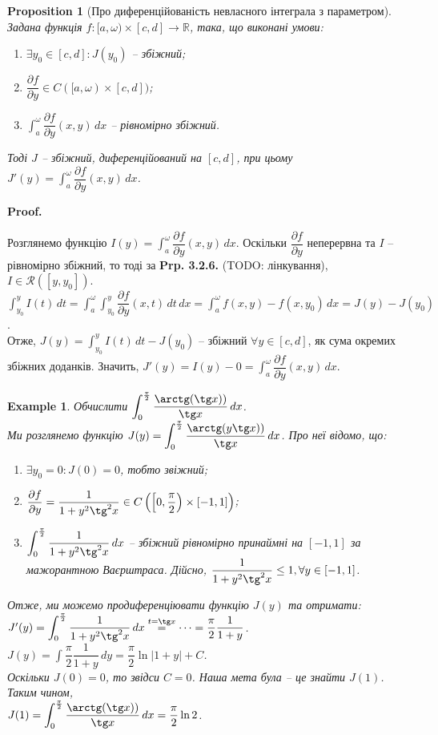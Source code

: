 \documentclass[a4paper, 10pt]{article}
\makeatletter
\def\departial#1#2{\dfrac{\partial {#1}}{\partial {#2}}}
\def\huge{\displaystyle}
\def\qed{$\blacksquare$}
\theoremstyle{theoremdd}
\theoremstyle{theoremdd}
\theoremstyle{theoremdd}
\theoremstyle{theoremdd}
\theoremstyle{theoremdd}
\newtheorem{example}[theorem]{Example}
\theoremstyle{theoremdd}
\newtheorem{proposition}[theorem]{Proposition}
\theoremstyle{theoremdd}
\theoremstyle{theoremdd}
\theoremstyle{theoremdd}
\renewenvironment{proof}[1][Proof.\\]{\par
\pushQED{\hfill \qed}%
\normalfont \topsep6\p@\@plus6\p@\relax
\trivlist
\item\relax
{\bfseries
#1\@addpunct{.}}\hspace\labelsep\ignorespaces
}{%
\popQED\endtrivlist\@endpefalse
}
\makeatother
\begin{document}
\begin{proposition}[Про диференційованість невласного інтеграла з параметром]
Задана функція $f \colon [a,\omega) \times [c,d] \to \mathbb{R}$, така, що виконані умови:
\begin{enumerate}[nosep,wide=0pt,label={\arabic*)}]
\item $\exists y_0 \in [c,d]: J(y_0)$ -- збіжний;
\item $\departial{f}{y} \in C([a,\omega) \times [c,d])$;
\item $\huge \int_a^\omega \departial{f}{y}(x,y)\,dx$ -- рівномірно збіжний.
\end{enumerate}
Тоді $J$ -- збіжний, диференційований на $[c,d]$, при цьому $J'(y) = \huge \int_a^\omega \departial{f}{y}(x,y)\,dx$.
\end{proposition}

\begin{proof}
Розглянемо функцію $I(y) = \huge \int_a^\omega \departial{f}{y}(x,y)\,dx$. Оскільки $\departial{f}{y}$ неперервна та $I$ -- рівномірно збіжний, то тоді за \textbf{Prp. 3.2.6.} (TODO: лінкування), $I \in \mathcal{R}([y,y_0])$.\\
$\huge \int_{y_0}^y I(t)\,dt = \huge \int_a^\omega \int_{y_0}^y \departial{f}{y}(x,t)\,dt\,dx = \int_a^\omega f(x,y)-f(x,y_0)\,dx = J(y) - J(y_0)$.\\
Отже, $J(y) = \huge \int_{y_0}^y I(t)\,dt - J(y_0)$ -- збіжний $\forall y \in [c,d]$, як сума окремих збіжних доданків. Значить, $J'(y) = I(y) - 0 = \huge \int_a^\omega \departial{f}{y}(x,y)\,dx$.
\end{proof}

\begin{example}
Обчислити $\huge\int_0^{\frac{\pi}{2}} \dfrac{\arctg (\tg x))}{\tg x}\,dx$.\\
Ми розглянемо функцію $J(y) = \huge\int_0^{\frac{\pi}{2}} \dfrac{\arctg (y \tg x))}{\tg x}\,dx$. Про неї відомо, що:
\begin{enumerate}[nosep,wide=0pt,label={\arabic*)}]
\item $\exists y_0 = 0: J(0) = 0$, тобто звіжний;
\item $\departial{f}{y} = \dfrac{1}{1+y^2 \tg^2 x} \in C\left( \left[ 0, \dfrac{\pi}{2} \right) \times [-1,1] \right)$;
\item $\huge\int_0^{\frac{\pi}{2}} \dfrac{1}{1+y^2 \tg^2 x}\,dx$ -- збіжний рівномірно принаймні на $[-1,1]$ за мажорантною Ваєрштраса. Дійсно, $\dfrac{1}{1+y^2 \tg^2 x} \leq 1, \forall y \in [-1,1]$.\\
\end{enumerate}
Отже, ми можемо продиференціювати функцію $J(y)$ та отримати:\\
$J'(y) = \huge\int_0^{\frac{\pi}{2}} \dfrac{1}{1+y^2 \tg^2 x}\,dx \overset{t = \tg x}{=} \dots = \dfrac{\pi}{2} \dfrac{1}{1+y}$.\\
$J(y) = \huge\int \dfrac{\pi}{2} \dfrac{1}{1+y}\,dy = \dfrac{\pi}{2} \ln |1+y| + C$.\\
Оскільки $J(0) = 0$, то звідси $C = 0$. Наша мета була -- це знайти $J(1)$. Таким чином, \\ $J(1) = \huge\int_0^{\frac{\pi}{2}} \dfrac{\arctg (\tg x))}{\tg x}\,dx = \dfrac{\pi}{2} \ln 2$.
\end{example}
\end{document}
